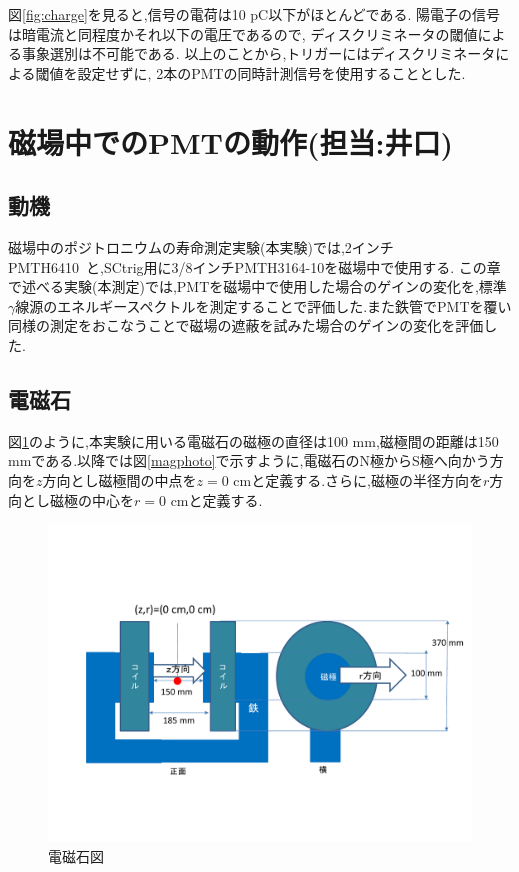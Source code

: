 図\ref{fig:charge}を見ると,信号の電荷は10 pC以下がほとんどである.
陽電子の信号は暗電流と同程度かそれ以下の電圧であるので,
ディスクリミネータの閾値による事象選別は不可能である.
以上のことから,トリガーにはディスクリミネータによる閾値を設定せずに,
2本のPMTの同時計測信号を使用することとした.


\section{磁場中でのPMTの動作(担当:井口)}


\subsection{動機}
磁場中のポジトロニウムの寿命測定実験(本実験)では,2インチPMT\hspace{3pt}H6410~\cite{pmtH6410}と,SCtrig用に3/8インチPMT\hspace{3pt}H3164-10\cite{pmtH3164-10}を磁場中で使用する.
この章で述べる実験(本測定)では,PMTを磁場中で使用した場合のゲインの変化を,標準$\gamma$線源のエネルギースペクトルを測定することで評価した.また鉄管でPMTを覆い同様の測定をおこなうことで磁場の遮蔽を試みた場合のゲインの変化を評価した.


\subsection{電磁石}
図\ref{magfigure}のように,本実験に用いる電磁石の磁極の直径は100 mm,磁極間の距離は150 mmである.以降では図\ref{magphoto}で示すように,電磁石のN極からS極へ向かう方向を$z$方向とし磁極間の中点を$z=0$ cmと定義する.さらに,磁極の半径方向を$r$方向とし磁極の中心を$r=0$ cmと定義する.

\begin{figure}[tbp]
	\centering
	\includegraphics[width=13cm]{fig/iguchi/magnetfigure.pdf}
	\caption{電磁石図}
	\label{magfigure}
\end{figure}

